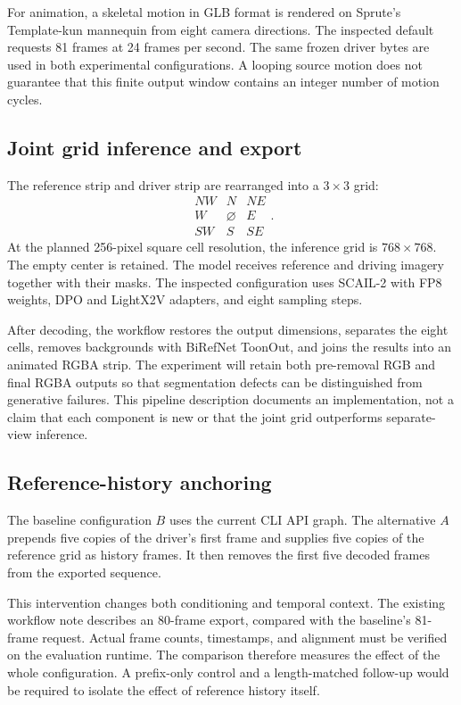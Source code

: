 \documentclass[11pt]{article}
\begin{document}
For animation, a skeletal motion in GLB format is rendered on Sprute's Template-kun mannequin from eight camera directions. The inspected default requests 81 frames at 24 frames per second. The same frozen driver bytes are used in both experimental configurations. A looping source motion does not guarantee that this finite output window contains an integer number of motion cycles.

\subsection{Joint grid inference and export}
The reference strip and driver strip are rearranged into a $3\times3$ grid:
\[
\begin{array}{ccc}
NW & N & NE\\
W & \varnothing & E\\
SW & S & SE
\end{array}.
\]
At the planned 256-pixel square cell resolution, the inference grid is $768\times768$. The empty center is retained. The model receives reference and driving imagery together with their masks. The inspected configuration uses SCAIL-2 with FP8 weights, DPO and LightX2V adapters, and eight sampling steps.

After decoding, the workflow restores the output dimensions, separates the eight cells, removes backgrounds with BiRefNet ToonOut, and joins the results into an animated RGBA strip. The experiment will retain both pre-removal RGB and final RGBA outputs so that segmentation defects can be distinguished from generative failures. This pipeline description documents an implementation, not a claim that each component is new or that the joint grid outperforms separate-view inference.

\subsection{Reference-history anchoring}
The baseline configuration $B$ uses the current CLI API graph. The alternative $A$ prepends five copies of the driver's first frame and supplies five copies of the reference grid as history frames. It then removes the first five decoded frames from the exported sequence.

This intervention changes both conditioning and temporal context. The existing workflow note describes an 80-frame export, compared with the baseline's 81-frame request. Actual frame counts, timestamps, and alignment must be verified on the evaluation runtime. The comparison therefore measures the effect of the whole configuration. A prefix-only control and a length-matched follow-up would be required to isolate the effect of reference history itself.
\end{document}
